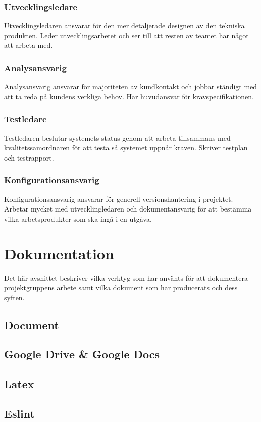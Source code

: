 \subsubsection*{Utvecklingsledare}
Utvecklingsledaren ansvarar för den mer detaljerade designen av den tekniska produkten. Leder utvecklingsarbetet och ser till att resten av teamet har något att arbeta med.

\subsubsection*{Analysansvarig}
Analysansvarig ansvarar för majoriteten av kundkontakt och jobbar ständigt med att ta reda på kundens verkliga behov. Har huvudansvar för kravspecifikationen.

\subsubsection*{Testledare}
Testledaren beslutar systemets status genom att arbeta tillsammans med kvalitetssamordnaren för att testa så systemet uppnår kraven. Skriver testplan och testrapport.

\subsubsection*{Konfigurationsansvarig}
Konfigurationsansvarig ansvarar för generell versionshantering i projektet. Arbetar mycket med utvecklingledaren och dokumentansvarig för att bestämma vilka arbetsprodukter som ska ingå i en utgåva.


\section{Dokumentation}
Det här avsnittet beskriver vilka verktyg som har använts för att dokumentera projektgruppens arbete samt vilka dokument som har producerats och dess syften.
\subsection*{Document}
\subsection*{Google Drive \& Google Docs}
\subsection*{Latex}
\subsection*{Eslint}
